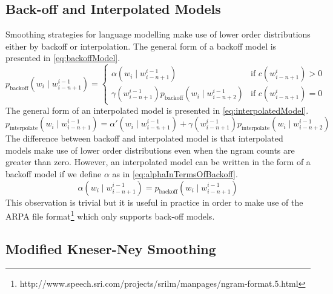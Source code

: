 \subsection{Back-off and Interpolated Models}

Smoothing strategies for language modelling make use of lower order
distributions either by backoff or interpolation. The general form of a backoff
model is presented in \autoref{eq:backoffModel}.
%
\begin{equation}
  p_{\text{backoff}}(w_i \mid w_{i - n + 1}^{i - 1}) =
  \begin{cases}
    \alpha(w_i \mid w_{i - n + 1}^{i - 1}) & \text{if } c(w_{i - n + 1}^i) > 0 \\
    \gamma(w_{i - n + 1}^{i - 1}) p_{\text{backoff}}(w_i \mid w_{i - n + 2}^{i - 1}) & \text{if } c(w_{i - n + 1}^i) = 0
  \end{cases}
  \label{eq:backoffModel}
\end{equation}
%
The general form of an interpolated model is presented in
\autoref{eq:interpolatedModel}.
%
\begin{equation}
  p_{\text{interpolate}}(w_i \mid w_{i - n + 1}^{i - 1}) = \alpha'(w_i \mid w_{i - n + 1}^{i - 1}) + \gamma(w_{i - n + 1}^{i - 1}) p_{\text{interpolate}}(w_i \mid w_{i - n + 2}^{i - 1})
  \label{eq:interpolatedModel}
\end{equation}
%
The difference between backoff and interpolated model is that interpolated
models make use of lower order distributions even when the ngram counts are
greater than zero. However, an interpolated model can be written in the form
of a backoff model if we define $\alpha$ as in
\autoref{eq:alphaInTermsOfBackoff}.
%
\begin{equation}
  \alpha(w_i \mid w_{i - n + 1}^{i - 1}) = p_{\text{backoff}}(w_i \mid w_{i - n + 1}^{i - 1})
  \label{eq:alphaInTermsOfBackoff}
\end{equation}
%
This observation is trivial but it is useful in practice in order to make use of
the ARPA file
format\footnote{http://www.speech.sri.com/projects/srilm/manpages/ngram-format.5.html}
which only supports back-off models.

\subsection{Modified Kneser-Ney Smoothing}
\label{sec:StatisticalMachineTranslationKneserNey}

